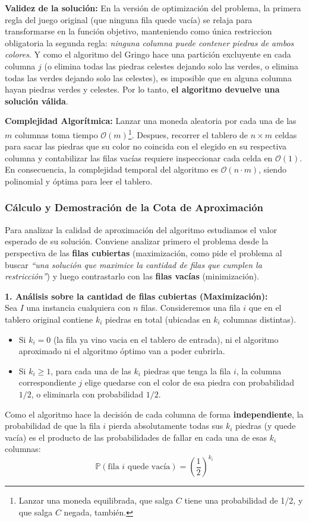 \noindent\textbf{Validez de la solución:} En la versión de optimización del problema, la primera regla del juego original (que ninguna fila quede vacía) se relaja para transformarse en la función objetivo, manteniendo como única restriccion obligatoria la segunda regla: \textit{ninguna columna puede contener piedras de ambos colores}. Y como el algoritmo del Gringo hace una partición excluyente en cada columna $j$ (o elimina todas las piedras celestes dejando solo las verdes, o elimina todas las verdes dejando solo las celestes), es imposible que en alguna columna hayan piedras verdes y celestes. Por lo tanto, \textbf{el algoritmo devuelve una solución válida}.

\textbf{Complejidad Algorítmica:} Lanzar una moneda aleatoria por cada una de las $m$ columnas toma tiempo $\mathcal{O}(m)$\footnote{Lanzar una moneda equilibrada, que salga $C$ tiene una probabilidad de 1/2, y que salga $C$ negada, también.}. Despues, recorrer el tablero de $n \times m$ celdas para sacar las piedras que su color no coincida con el elegido en su respectiva columna y contabilizar las filas vacías requiere inspeccionar cada celda en $\mathcal{O}(1)$. En consecuencia, la complejidad temporal del algoritmo es $\mathcal{O}(n \cdot m)$, siendo polinomial y óptima para leer el tablero.

\subsubsection{Cálculo y Demostración de la Cota de Aproximación}

Para analizar la calidad de aproximación del algoritmo estudiamos el valor esperado de su solución. Conviene analizar primero el problema desde la perspectiva de las \textbf{filas cubiertas} (maximización, como pide el problema al buscar \textit{``una solución que maximice la cantidad de filas que cumplen la restricción''}) y luego contrastarlo con las \textbf{filas vacías} (minimización).

\textbf{1. Análisis sobre la cantidad de filas cubiertas (Maximización):} \\
Sea $I$ una instancia cualquiera con $n$ filas. Consideremos una fila $i$ que en el tablero original contiene $k_i$ piedras en total (ubicadas en $k_i$ columnas distintas).
\begin{itemize}
    \item Si $k_i = 0$ (la fila ya vino vacia en el tablero de entrada), ni el algoritmo aproximado ni el algoritmo óptimo van a poder cubrirla.
    \item Si $k_i \ge 1$, para cada una de las $k_i$ piedras que tenga la fila $i$, la columna correspondiente $j$ elige quedarse con el color de esa piedra con probabilidad $1/2$, o eliminarla con probabilidad $1/2$.
\end{itemize}
Como el algoritmo hace la decisión de cada columna de forma \textbf{independiente}, la probabilidad de que la fila $i$ pierda absolutamente todas sus $k_i$ piedras (y quede vacía) es el producto de las probabilidades de fallar en cada una de esas $k_i$ columnas:
\[ \mathbb{P}(\text{fila } i \text{ quede vacía}) = \left(\frac{1}{2}\right)^{k_i} \]

